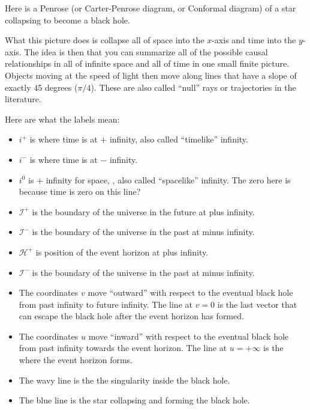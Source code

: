 \documentclass[border=3pt,tikz]{article}
\def\scri{\mathcal I}
\begin{document}
Here is a Penrose (or Carter-Penrose diagram, or Conformal diagram) of a star collapsing to become a black hole.

What this picture does is collapse all of space into the $x$-axis and time into the $y$-axis.
The idea is then that you can summarize all of the possible causal relationships in
all of infinite space and all of time in one small finite picture. Objects moving at the speed
of light then move along lines that have a slope of exactly 45 degrees
($\pi/4$). These are also called ``null'' rays or trajectories in the literature.


Here are what the labels mean:

\begin{itemize}
\item $i^+$ is where time is at $+$ infinity, also called ``timelike'' infinity.
\item $i^-$ is where time is at $-$ infinity.
\item $i^0$ is $+$ infinity for space, , also called ``spacelike'' infinity. The zero here is because
time is zero on this line?
\item $\scri^+$ is the boundary of the universe in the future at plus infinity.
\item $\scri^-$ is the boundary of the universe in the past at minus infinity.
\item ${\mathcal H}^+$ is position of the event horizon at plus infinity.
\item $\scri^-$ is the boundary of the universe in the past at minus infinity.
\item The coordinates $v$ move ``outward'' with respect to the eventual black hole from past
infinity to future infinity. The line at $v=0$ is the last vector that can escape the black hole
after the event horizon has formed.
\item The coordinates $u$ move ``inward'' with respect to the eventual black hole from past
infinity towards the event horizon. The line at $u=+\infty$ is the where the event horizon forms.
\item The wavy line is the the singularity inside the black hole.
\item The blue line is the star collapsing and forming the black hole.
\end{itemize}
\end{document}
